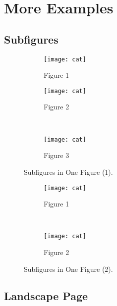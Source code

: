\chapter{More Examples}
\label{chap:examples}

\section{Subfigures}
\begin{figure*}[ht!]
    \centering
    \begin{subfigure}[b]{0.67\textwidth}
        \centering
        \texttt{[image: cat]}
        \caption{Figure 1}
    \end{subfigure}
    \hfill
    \begin{minipage}[b]{0.3\textwidth}
	    \begin{subfigure}[b]{\linewidth}
	        \centering
	        \texttt{[image: cat]}
	        \caption{Figure 2}
	    \end{subfigure}
	    \\
	    \begin{subfigure}[b]{\linewidth}
	        \centering
	        \texttt{[image: cat]}
	        \caption{Figure 3}
	    \end{subfigure}
	\end{minipage}
    \caption{Subfigures in One Figure (1).}
    \label{fig:subfigures-1}
\end{figure*}

\begin{figure*}[ht!]
    \centering
    \begin{subfigure}[b]{0.67\textwidth}
        \centering
        \texttt{[image: cat]}
        \caption{Figure 1}
    \end{subfigure}
    ~
    \begin{subfigure}[b]{0.67\textwidth}
        \centering
        \texttt{[image: cat]}
        \caption{Figure 2}
    \end{subfigure}
    \caption{Subfigures in One Figure (2).}
    \label{fig:subfigures-2}
\end{figure*}

\section{Landscape Page}

